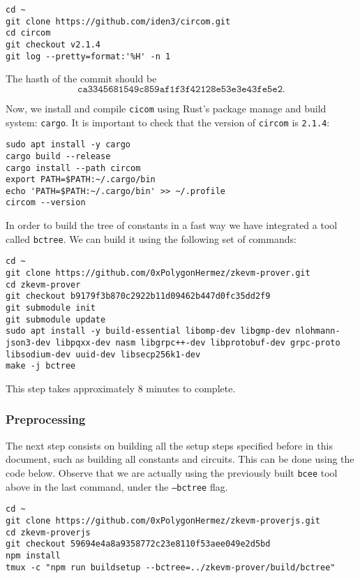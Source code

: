 \begin{lstlisting}[style=termt]
cd ~
git clone https://github.com/iden3/circom.git
cd circom
git checkout v2.1.4
git log --pretty=format:'%H' -n 1
\end{lstlisting}

The hasth of the commit should be 
\[
\texttt{ca3345681549c859af1f3f42128e53e3e43fe5e2.}
\]

Now, we install and compile \texttt{cicom} using Rust's package manage and build system: \texttt{cargo}. It is important to check that the version of \texttt{circom} is \texttt{2.1.4}:

\begin{lstlisting}[style=termt]
sudo apt install -y cargo
cargo build --release
cargo install --path circom
export PATH=$PATH:~/.cargo/bin
echo 'PATH=$PATH:~/.cargo/bin' >> ~/.profile
circom --version
\end{lstlisting}

In order to build the tree of constants in a fast way we have integrated a tool called \texttt{bctree}. We can build it using the following set of commands:

\begin{lstlisting}[style=termt]
cd ~
git clone https://github.com/0xPolygonHermez/zkevm-prover.git
cd zkevm-prover
git checkout b9179f3b870c2922b11d09462b447d0fc35dd2f9
git submodule init
git submodule update
sudo apt install -y build-essential libomp-dev libgmp-dev nlohmann-json3-dev libpqxx-dev nasm libgrpc++-dev libprotobuf-dev grpc-proto libsodium-dev uuid-dev libsecp256k1-dev
make -j bctree
\end{lstlisting}

This step takes approximately $8$ minutes to complete.



\subsubsection{Preprocessing}

The next step consists on building all the setup steps specified before in this document, such as building all constants and circuits. This can be done using the code below. Observe that we are actually using the previously built \texttt{bcee} tool above in the last command, under the \texttt{--bctree} flag.

\begin{lstlisting}[style=termt]
cd ~
git clone https://github.com/0xPolygonHermez/zkevm-proverjs.git
cd zkevm-proverjs
git checkout 59694e4a8a9358772c23e8110f53aee049e2d5bd
npm install
tmux -c "npm run buildsetup --bctree=../zkevm-prover/build/bctree"
\end{lstlisting}

